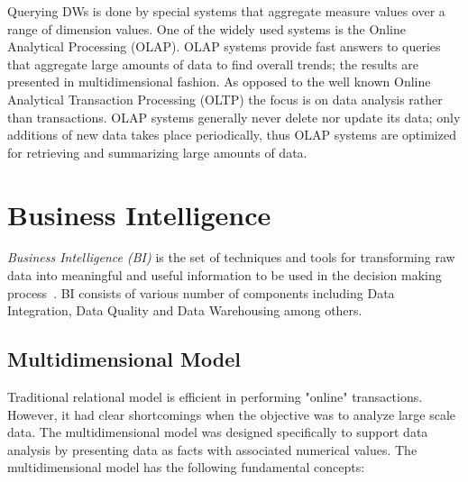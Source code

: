 Querying DWs is done by special systems that aggregate measure values over a range of dimension values. One of the widely used systems is the Online Analytical Processing (OLAP). OLAP systems provide fast answers to queries that aggregate large amounts of data to find overall trends; the results are presented in multidimensional fashion. As opposed to the well known Online Analytical Transaction Processing (OLTP) the focus is on data analysis rather than transactions. OLAP systems generally never delete nor update its data; only additions of new data takes place periodically, thus OLAP systems are optimized for retrieving and summarizing large amounts of data.

\section{Business Intelligence}\label{section:businessIntelligence}

\textit{Business Intelligence (BI)} is the set of techniques and tools for transforming raw data into meaningful and useful information to be used in the decision making process~\cite{Rud:Wiley:09}. BI consists of various number of components including Data Integration, Data Quality and Data Warehousing among others.

\subsection{Multidimensional Model}

Traditional relational model is efficient in performing "online" transactions. However, it had clear shortcomings when the objective was to analyze large scale data. The multidimensional model was designed specifically to support data analysis by presenting data as facts with associated numerical values. The multidimensional model has the following fundamental concepts:

